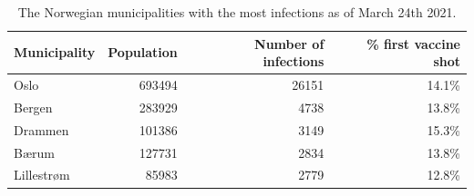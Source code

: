 \begin{table}[H] 
\caption{The Norwegian municipalities with the most infections as of March 24th 2021. \label{top5norway}}
\begin{tabular}{l r r r}
\toprule
\textbf{Municipality}	& \textbf{Population}	& \textbf{Number of infections} &\textbf{\% first vaccine shot} \\
\midrule
Oslo & 693494 & 26151 & 14.1\%\\
Bergen & 283929 & 4738 & 13.8\%\\
Drammen & 101386 & 3149 & 15.3\%\\
Bærum & 127731 & 2834 & 13.8\%\\
Lillestrøm & 85983 & 2779 & 12.8\%\\
\bottomrule
\end{tabular}
\end{table}
